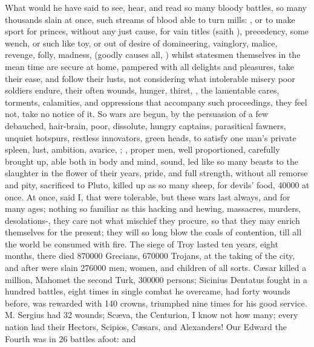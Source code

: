 {What would he have said to see, hear, and read so many bloody battles,
so many thousands slain at once, such streams of blood able to turn
mills: , or to make sport for princes, without
any just cause, for vain titles (saith \Austin{}), precedency, some
wench, or such like toy, or out of desire of domineering, vainglory,
malice, revenge, folly, madness, (goodly causes all, ) whilst statesmen themselves in the
mean time are secure at home, pampered with all delights and pleasures,
take their ease, and follow their lusts, not considering what
intolerable misery poor soldiers endure, their often wounds, hunger,
thirst, \etc{}, the lamentable cares, torments, calamities, and
oppressions that accompany such proceedings, they feel not, take no
notice of it. So wars are begun, by the persuasion of a few debauched,
hair-brain, poor, dissolute, hungry captains, parasitical fawners,
unquiet hotspurs, restless innovators, green heads, to satisfy one
man's private spleen, lust, ambition, avarice, \etc{}; , proper men, well
proportioned, carefully brought up, able both in body and mind, sound,
led like so many beasts to the slaughter in the flower of their
years, pride, and full strength, without all remorse and pity,
sacrificed to Pluto, killed up as so many sheep, for devils' food,
40\thinspace{}000 at once. At once, said I, that were tolerable, but these wars
last always, and for many ages; nothing so familiar as this hacking and
hewing, massacres, murders, desolations-,
they care not what mischief they procure, so that they may enrich
themselves for the present; they will so long blow the coals of
contention, till all the world be consumed with fire. The siege of
Troy lasted ten years, eight months, there died 870\thinspace{}000 Grecians,
670\thinspace{}000 Trojans, at the taking of the city, and after were slain
276\thinspace{}000 men, women, and children of all sorts. C\ae{}sar killed a million,
Mahomet the second Turk, 300\thinspace{}000 persons; Sicinius Dentatus fought
in a hundred battles, eight times in single combat he overcame, had
forty wounds before, was rewarded with 140 crowns, triumphed nine times
for his good service. M. Sergius had 32 wounds; Sc\ae{}va, the Centurion,
I know not how many; every nation had their Hectors, Scipios, C\ae{}sars,
and Alexanders! Our Edward the Fourth was in 26 battles afoot: and
}

